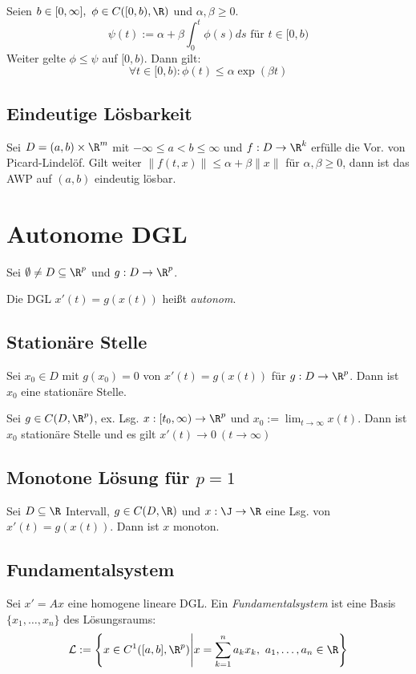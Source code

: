 Seien \(b \in [0,\infty], \ \phi \in C([0,b),\R)\) und \(\alpha, \beta \geq 0\).
\[\psi(t) := \alpha + \beta \int_0^t \phi(s) ds \text{ für } t \in [0,b)\]
Weiter gelte \(\phi \leq \psi\) auf \([0,b)\). Dann gilt:
\[\forall t \in [0,b) : \phi(t) \leq \alpha \exp(\beta t)\]

\subsection*{Eindeutige Lösbarkeit}

Sei \(D = (a,b) \times \R^m\) mit \(-\infty \leq a < b \leq \infty\) und \(f : D \to \R^k\) erfülle die Vor. von Picard-Lindelöf. Gilt weiter \(\|f(t,x)\| \leq \alpha + \beta \|x\|\) für \(\alpha, \beta \geq 0\), dann ist das AWP auf \((a,b)\) eindeutig lösbar.

\section*{Autonome DGL}

Sei \(\emptyset \neq D \subseteq \R^p\) und \(g : D \to \R^p\).

Die DGL \(x'(t)=g(x(t))\) heißt \emph{autonom}.

\subsection*{Stationäre Stelle}

Sei \(x_0 \in D\) mit \(g(x_0)=0\) von \(x'(t)=g(x(t))\) für \(g : D \to \R^p\). Dann ist \(x_0\) eine stationäre Stelle.

\spacing

Sei \(g \in C(D,\R^p)\), ex. Lsg. \(x: [t_0,\infty) \to \R^p\) und \(x_0 := \lim_{t \to \infty} x(t)\). Dann ist \(x_0\) stationäre Stelle und es gilt \(x'(t) \to 0 \ (t \to \infty)\)

\subsection*{Monotone Lösung für \(p=1\)}

Sei \(D \subseteq \R\) Intervall, \(g \in C(D,\R)\) und \(x : \J \to \R\) eine Lsg. von \(x'(t)=g(x(t))\). Dann ist \(x\) monoton.

\subsection*{Fundamentalsystem}

Sei \(x'=Ax\) eine homogene lineare DGL. Ein \emph{Fundamentalsystem} ist eine Basis \(\{x_1,\dots,x_n\}\) des Lösungsraums: \[\mathcal{L} := \left\{ x \in C^1([a,b],\R^p) \middle| x=\sum_{k=1}^n a_k x_k, \ a_1,\dots,a_n \in \R \right\}\]

